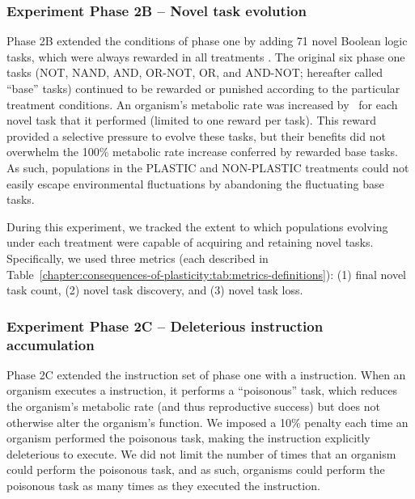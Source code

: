\subsubsection{Experiment Phase 2B -- Novel task evolution}
\label{chapter:consequences-of-plasticity:sec:methods:experiment:novel-task-evolution}

Phase 2B extended the conditions of phase one by adding 71 novel Boolean logic tasks, which were always rewarded in all treatments \citep{ofria_avida:_2009}.
The original six phase one tasks (NOT, NAND, AND, OR-NOT, OR, and AND-NOT; hereafter called ``base'' tasks) continued to be rewarded or punished according to the particular treatment conditions.
An organism's metabolic rate was increased by \novelTraitsReward\ for each novel task that it performed (limited to one reward per task).
This reward provided a selective pressure to evolve these tasks, but their benefits did not overwhelm the 100\% metabolic rate increase conferred by rewarded base tasks. 
As such, populations in the PLASTIC and NON-PLASTIC treatments could not easily escape environmental fluctuations by abandoning the fluctuating base tasks.

During this experiment, we tracked the extent to which populations evolving under each treatment were capable of acquiring and retaining novel tasks.  
Specifically, we used three metrics (each described in Table~\ref{chapter:consequences-of-plasticity:tab:metrics-definitions}):
(1) final novel task count,     
(2) novel task discovery,    
and (3) novel task loss. 

\subsubsection{Experiment Phase 2C -- Deleterious instruction accumulation}
\label{chapter:consequences-of-plasticity:sec:methods:experiment:deleterious-instruction-accumulation}

Phase 2C extended the instruction set of phase one with a  instruction.
When an organism executes a  instruction, it performs a ``poisonous'' task, which reduces the organism's metabolic rate (and thus reproductive success) but does not otherwise alter the organism's function.
We imposed a 10\% penalty each time an organism performed the poisonous task, making the  instruction explicitly deleterious to execute.
We did not limit the number of times that an organism could perform the poisonous task, and as such, organisms could perform the poisonous task as many times as they executed the  instruction. 

